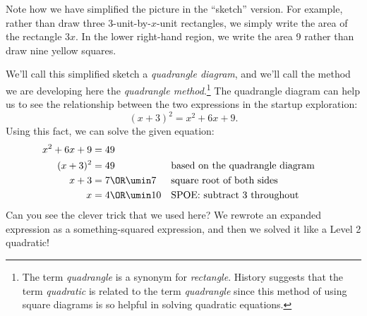 \begin{minipage}{0.49\linewidth}
\centering
{}
\end{minipage}
\begin{minipage}{0.49\textwidth}
\end{minipage}

Note how we have simplified the picture in the ``sketch'' version. For example, rather than draw three 3-unit-by-$x$-unit rectangles, we simply write the area of the rectangle $3x$. In the lower right-hand region, we write the area 9 rather than draw nine yellow squares.

We'll call this simplified sketch a \textit{quadrangle diagram}, and we'll call the method we are developing here the \textit{quadrangle method}.\footnote{The term \textit{quadrangle} is a synonym for \textit{rectangle}. History suggests that the term \textit{quadratic} is related to the term \textit{quadrangle} since this method of using square diagrams is so helpful in solving quadratic equations.} The quadrangle diagram can help us to see the relationship between the two expressions in the startup exploration:
\[(x+3)^2 = x^2 + 6x + 9.\]
Using this fact, we can solve the given equation:
\begin{align*}
x^2 + 6x + 9 &= 49
\\
(x+3)^2 &= 49
&&\text{based on the quadrangle diagram}
\\
x+3 &= 7 \OR \umin7
&&\text{square root of both sides}
\\
x &= 4 \OR \umin10
&&\text{SPOE: subtract 3 throughout}
\end{align*}
Can you see the clever trick that we used here? We rewrote an expanded expression as a something-squared expression, and then we solved it like a Level 2 quadratic!

